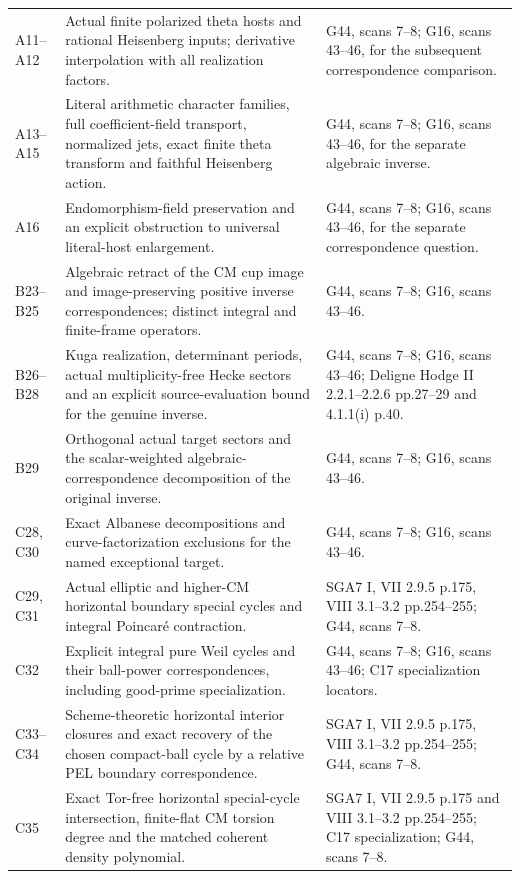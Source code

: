 \documentclass[11pt]{article}
\theoremstyle{definition}\newtheorem{definition}[theorem]{Definition}\newtheorem{remark}[theorem]{Remark}
\begin{document}
\begin{longtable}{@{}p{.18\linewidth}p{.48\linewidth}p{.27\linewidth}@{}}
A11--A12 & Actual finite polarized theta hosts and rational Heisenberg inputs; derivative interpolation with all realization factors. & G44, scans 7--8; G16, scans 43--46, for the subsequent correspondence comparison.\\
A13--A15 & Literal arithmetic character families, full coefficient-field transport, normalized jets, exact finite theta transform and faithful Heisenberg action. & G44, scans 7--8; G16, scans 43--46, for the separate algebraic inverse.\\
A16 & Endomorphism-field preservation and an explicit obstruction to universal literal-host enlargement. & G44, scans 7--8; G16, scans 43--46, for the separate correspondence question.\\
B23--B25 & Algebraic retract of the CM cup image and image-preserving positive inverse correspondences; distinct integral and finite-frame operators. & G44, scans 7--8; G16, scans 43--46.\\
B26--B28 & Kuga realization, determinant periods, actual multiplicity-free Hecke sectors and an explicit source-evaluation bound for the genuine inverse. & G44, scans 7--8; G16, scans 43--46; Deligne Hodge II 2.2.1--2.2.6 pp.27--29 and 4.1.1(i) p.40.\\
B29 & Orthogonal actual target sectors and the scalar-weighted algebraic-correspondence decomposition of the original inverse. & G44, scans 7--8; G16, scans 43--46.\\
C28, C30 & Exact Albanese decompositions and curve-factorization exclusions for the named exceptional target. & G44, scans 7--8; G16, scans 43--46.\\
C29, C31 & Actual elliptic and higher-CM horizontal boundary special cycles and integral Poincar\'e contraction. & SGA7 I, VII 2.9.5 p.175, VIII 3.1--3.2 pp.254--255; G44, scans 7--8.\\
C32 & Explicit integral pure Weil cycles and their ball-power correspondences, including good-prime specialization. & G44, scans 7--8; G16, scans 43--46; C17 specialization locators.\\
C33--C34 & Scheme-theoretic horizontal interior closures and exact recovery of the chosen compact-ball cycle by a relative PEL boundary correspondence. & SGA7 I, VII 2.9.5 p.175, VIII 3.1--3.2 pp.254--255; G44, scans 7--8.\\
C35 & Exact Tor-free horizontal special-cycle intersection, finite-flat CM torsion degree and the matched coherent density polynomial. & SGA7 I, VII 2.9.5 p.175 and VIII 3.1--3.2 pp.254--255; C17 specialization; G44, scans 7--8.\\

\end{longtable}
\end{document}
